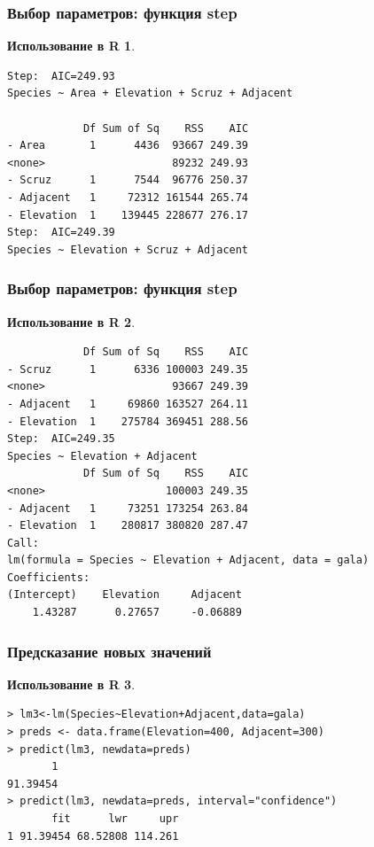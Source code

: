 \documentclass{beamer}
\newtheorem{exmpr}{Использование в R}
\begin{document}
\begin{frame}[containsverbatim]
\frametitle{Выбор параметров: функция step}

\begin{exmpr}
\begin{verbatim}
Step:  AIC=249.93
Species ~ Area + Elevation + Scruz + Adjacent

            Df Sum of Sq    RSS    AIC
- Area       1      4436  93667 249.39
<none>                    89232 249.93
- Scruz      1      7544  96776 250.37
- Adjacent   1     72312 161544 265.74
- Elevation  1    139445 228677 276.17
Step:  AIC=249.39
Species ~ Elevation + Scruz + Adjacent
\end{verbatim}
\end{exmpr}

\end{frame}

\begin{frame}[containsverbatim]
\frametitle{Выбор параметров: функция step}

\begin{exmpr}
\begin{verbatim}
            Df Sum of Sq    RSS    AIC
- Scruz      1      6336 100003 249.35
<none>                    93667 249.39
- Adjacent   1     69860 163527 264.11
- Elevation  1    275784 369451 288.56
Step:  AIC=249.35
Species ~ Elevation + Adjacent
            Df Sum of Sq    RSS    AIC
<none>                   100003 249.35
- Adjacent   1     73251 173254 263.84
- Elevation  1    280817 380820 287.47
Call:
lm(formula = Species ~ Elevation + Adjacent, data = gala)
Coefficients:
(Intercept)    Elevation     Adjacent  
    1.43287      0.27657     -0.06889  
\end{verbatim}
\end{exmpr}

\end{frame}

\begin{frame}[containsverbatim]
\frametitle{Предсказание новых значений}
\begin{exmpr}
\begin{verbatim}
> lm3<-lm(Species~Elevation+Adjacent,data=gala)
> preds <- data.frame(Elevation=400, Adjacent=300)
> predict(lm3, newdata=preds) 
       1 
91.39454
> predict(lm3, newdata=preds, interval="confidence")
       fit      lwr     upr
1 91.39454 68.52808 114.261
\end{verbatim}
\end{exmpr}

\end{frame}
\end{document}
